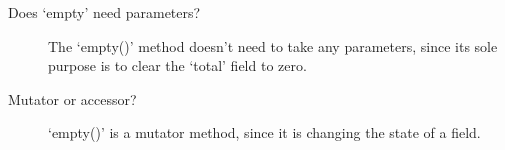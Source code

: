 \begin{description}
	\item [Does `empty' need parameters? ] The `empty()' method
		doesn't need to take any parameters, since its sole
		purpose is to clear the `total' field to zero.
	\item [Mutator or accessor? ] `empty()' is a mutator method,
		since it is changing the state of a field.
\end{description}
